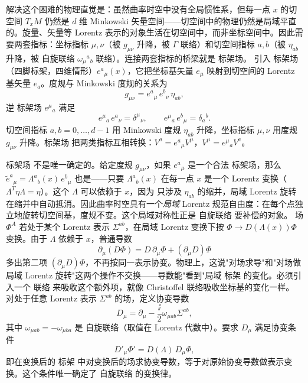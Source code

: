 解决这个困难的物理直觉是：虽然曲率时空中没有全局惯性系，但每一点 $x$ 的切空间 $T_xM$ 仍然是 $d$ 维 Minkowski 矢量空间——切空间中的物理仍然是局域平直的。旋量、矢量等 Lorentz 表示的对象生活在切空间中，而非坐标空间中。因此需要两套指标：坐标指标 $\mu,\nu$（被 $g_{\mu\nu}$ 升降，被 $\Gamma$ 联络）和切空间指标 $a,b$（被 $\eta_{ab}$ 升降，被 自旋联络 $\omega_\mu{}^a{}_b$ 联络）。连接两套指标的桥梁就是 标架场。
引入 标架场（四脚标架，四维情形）$e^a{}_\mu(x)$，它把坐标基矢量 $e_\mu$ 映射到切空间的 Lorentz 基矢量 $e_a$。度规与 Minkowski 度规的关系为
\begin{equation}\label{eq:ms-curved-vielbein}
{g_{\mu\nu}=e^a{}_\mu\,e^b{}_\nu\,\eta_{ab},}
\end{equation}
逆 标架场 $e^\mu{}_a$ 满足
\begin{equation}
e^\mu{}_a\,e^a{}_\nu=\delta^\mu{}_\nu,\qquad e^\mu{}_a\,e^b{}_\mu=\delta_a{}^b.
\end{equation}
切空间指标 $a,b=0,\ldots,d-1$ 用 Minkowski 度规 $\eta_{ab}$ 升降，坐标指标 $\mu,\nu$ 用度规 $g_{\mu\nu}$ 升降。标架场 把两类指标互相转换：$V^a=e^a{}_\mu V^\mu$，$V^\mu=e^\mu{}_a V^a$。

标架场 不是唯一确定的。给定度规 $g_{\mu\nu}$，如果 $e^a{}_\mu$ 是一个合法 标架场，那么 $\tilde e^a{}_\mu=\Lambda^a{}_b(x)\,e^b{}_\mu$ 也是——只要 $\Lambda^a{}_b(x)$ 在每一点 $x$ 是一个 Lorentz 变换（$\Lambda^T\eta\Lambda=\eta$）。这个 $\Lambda$ 可以依赖于 $x$，因为 只涉及 $\eta_{ab}$ 的缩并，局域 Lorentz 旋转在缩并中自动抵消。因此曲率时空具有一个\emph{局域} Lorentz 规范自由度：在每个点独立地旋转切空间基，度规不变。这个局域对称性正是 自旋联络 要补偿的对象。
场 $\Phi^A$ 若处于某个 Lorentz 表示 $\Sigma^{ab}$，在局域 Lorentz 变换下按 $\Phi\to D(\Lambda(x))\Phi$ 变换。由于 $\Lambda$ 依赖于 $x$，普通导数
\begin{equation*}
\partial_\mu(D\Phi)=D\,\partial_\mu\Phi+(\partial_\mu D)\Phi
\end{equation*}
多出第二项 $(\partial_\mu D)\Phi$，不再按同一表示协变。物理上，这说"对场求导"和"对场做局域 Lorentz 旋转"这两个操作不交换——导数能"看到"局域 标架 的变化。必须引入一个 联络 来吸收这个额外项，就像 Christoffel 联络吸收坐标基的变化一样。
对处于任意 Lorentz 表示 $\Sigma^{ab}$ 的场，定义协变导数
\begin{equation}\label{eq:ms-curved-Dmu}
{
D_\mu=\partial_\mu-\frac{\ii}{2}\omega_{\mu ab}\Sigma^{ab},
}
\end{equation}
其中 $\omega_{\mu ab}=-\omega_{\mu ba}$ 是 自旋联络（取值在 Lorentz 代数中）。要求 $D_\mu$ 满足协变条件
\begin{equation}\label{eq:ms-curved-D-cov}
D'_\mu\Phi'=D(\Lambda)\,D_\mu\Phi,
\end{equation}
即在变换后的 标架 中对变换后的场求协变导数，等于对原始协变导数做表示变换。这个条件唯一确定了 自旋联络 的变换律。


